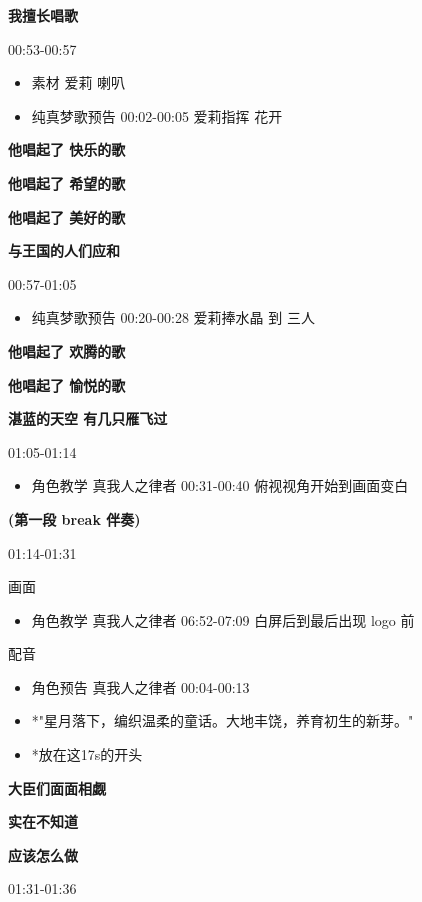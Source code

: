 \documentclass[a4paper]{article}
\begin{document}
\textbf{我擅长唱歌}

00:53-00:57

\begin{itemize}
    \item 素材 爱莉 喇叭
    \item 纯真梦歌预告 00:02-00:05 爱莉指挥 花开
\end{itemize}

\textbf{他唱起了 快乐的歌}

\textbf{他唱起了 希望的歌}

\textbf{他唱起了 美好的歌}

\textbf{与王国的人们应和}

00:57-01:05

\begin{itemize}
    \item 纯真梦歌预告 00:20-00:28 爱莉捧水晶 到 三人
\end{itemize}

\textbf{他唱起了 欢腾的歌}

\textbf{他唱起了 愉悦的歌}

\textbf{湛蓝的天空 有几只雁飞过}

01:05-01:14

\begin{itemize}
    \item 角色教学 真我人之律者 00:31-00:40 俯视视角开始到画面变白
\end{itemize}

\textbf{(第一段 break 伴奏)}

01:14-01:31

画面

\begin{itemize}
    \item 角色教学 真我人之律者 06:52-07:09 白屏后到最后出现 logo 前
\end{itemize}

配音

\begin{itemize}
    \item 角色预告 真我人之律者 00:04-00:13
    \item *"星月落下，编织温柔的童话。大地丰饶，养育初生的新芽。"
    \item *放在这17s的开头
\end{itemize}

\textbf{大臣们面面相觑}

\textbf{实在不知道}

\textbf{应该怎么做}

01:31-01:36
\end{document}
